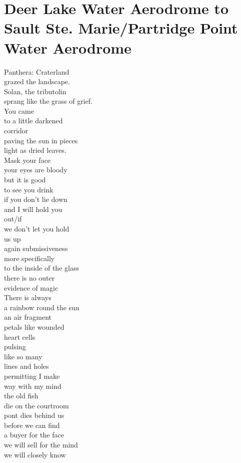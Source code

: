 \documentclass[smalldemyvopaper,11pt,twoside,onecolumn,openright,extrafontsizes]{memoir}
\begin{document}
\chapter{Deer Lake Water Aerodrome to Sault Ste. Marie/Partridge Point Water Aerodrome}
Panthera: Craterland
\\grazed the landscape.
\\Solan, the tributolin
\\sprang like the grass of grief.
\\You came
\\to a little darkened
\\corridor
\\paving the sun in pieces
\\light as dried leaves.
\\Mask your face
\\your eyes are bloody
\\but it is good
\\to see you drink
\\if you don't lie down
\\and I will hold you
\\out/if
\\we don't let you hold
\\us up
\\again submissiveness
\\more specifically
\\to the inside of the glass
\\there is no outer
\\evidence of magic
\\There is always
\\a rainbow round the sun
\\an air fragment
\\petals like wounded
\\heart cells
\\pulsing
\\like so many
\\lines and holes
\\permitting I make
\\way with my mind
\\the old fish
\\die on the courtroom
\\pont dies behind us
\\before we can find
\\a buyer for the face
\\we will sell for the mind
\\we will closely know
\end{document}
